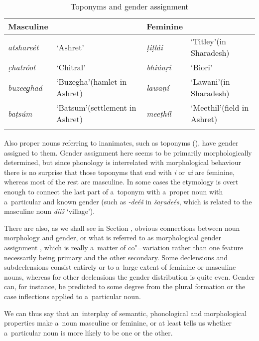 \begin{table}[ht]
\caption{Toponyms and gender assignment}
\begin{tabularx}{\textwidth}{ l Q l Q }
\lsptoprule
Masculine &
&
Feminine &
\\\hline
\textit{atshareét} &
`Ashret' &
\textit{ṭiṭlái} &
`Titley'\newline (in Sharadesh)\\
\textit{c̣hatróol} &
`Chitral' &
\textit{bhiúuṛi} &
`Biori'\\
\textit{buzeeɡhaá} &
`Buzegha'\newline (hamlet in Ashret) &
\textit{lawaṇí} &
`Lawani'\newline (in Sharadesh)\\
\textit{baṭsúm} &
`Batsum'\newline (settlement in Ashret) &
\textit{meeṭhíl} &
`Meethil'\newline (field in Ashret)\\\lspbottomrule
\end{tabularx}
\label{tab:4-3}
\end{table}


Also proper nouns referring to inanimates, such as toponyms (), have gender assigned to them. Gender assignment here seems to be primarily morphologically determined, but since phonology is interrelated with morphological behaviour there is no surprise that those toponyms that end with \textit{i} or \textit{ai} are feminine, whereas most of the rest are masculine. In some cases the etymology is overt enough to connect the last part of a~toponym with a~proper noun with a~particular and known gender (such as \textit{-deéš} in \textit{šaṛadeés}, which is related to the masculine noun \textit{díiš} `village').


There are also, as we shall see in Section , obvious connections between noun morphology and gender, or what is referred to as morphological gender assignment \citep[34--50]{corbett1991}, which is really a~matter of co"=variation rather than one feature necessarily being primary and the other secondary. Some declensions and subdeclensions consist entirely or to a~large extent of feminine or masculine nouns, whereas for other declensions the gender distribution is quite even. Gender can, for instance, be predicted to some degree from the plural formation or the case inflections applied to a~particular noun.


We can thus say that an~interplay of semantic, phonological and morphological properties make a~noun masculine or feminine, or at least tells us whether a~particular noun is more likely to be one or the other. 



